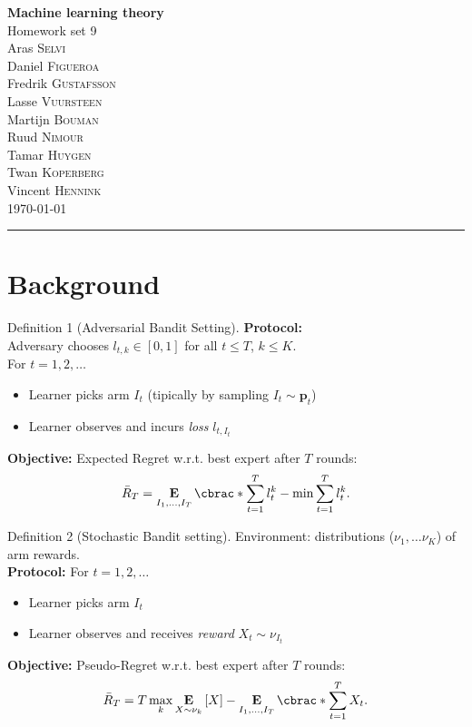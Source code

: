 \documentclass[10pt, a4paper, twoside]{amsart}
\theoremstyle{plain}
\DeclarePairedDelimiter\cbrac\{\}
\newcommand{\Ev}{\operatorname*{\ensuremath{\mathbf{E}}}} %
\begin{document}
\begin{center}
    {\huge\bf Machine learning theory}\\
    {\large\sc Homework set 9 }\\ \vspace{1em}
    {Aras} \textsc{ {Selvi}} \\
    {Daniel} \textsc{ {Figueroa}}\\
    {Fredrik} \textsc{ {Gustafsson}}\\
    {Lasse} \textsc{ {Vuursteen}}\\
    {Martijn} \textsc{ {Bouman}}\\
    {Ruud} \textsc{ {Nimour}}\\
    {Tamar} \textsc{ {Huygen}}\\
    {Twan} \textsc{ {Koperberg}}\\
    {Vincent} \textsc{ {Hennink}}\\ 
    \bigskip
    \today \bigskip
    \hrule
    \bigskip
\end{center}

\section{Background}
\begin{definitionbox}{Definition 1 (Adversarial Bandit Setting).}
  \textbf{Protocol:}\\
  Adversary chooses $l_{t,k} \in [0,1]$ for all $t \leq T$, $k \leq K$.\\
  For $t = 1,2, \ldots$
\begin{itemize}
    \item Learner picks arm $I_t$ (tipically by sampling $I_t \sim \mathbf{p}_t$)
    \item Learner observes and incurs \textit{loss} $l_{t, I_{t}}$
\end{itemize}
\textbf{Objective:} Expected Regret w.r.t. best expert after $T$ rounds:
\begin{equation*}
    \bar{R}_T = \Ev_{I_1 , \ldots , I_T} \cbrac*{\sum^T_{t=1} l_t^k} - \min \sum_{t=1}^T l_t^k .
\end{equation*}
\end{definitionbox}
\begin{definitionbox}{Definition 2 (Stochastic Bandit setting).}
  Environment: distributions ($\nu_1 , \ldots \nu_K$) of arm rewards.\\
\textbf{Protocol:} For $t = 1,2, \ldots$
\begin{itemize}
    \item Learner picks arm $I_t$
    \item Learner observes and receives \textit{reward} $X_t \sim \nu_{I_t}$
\end{itemize}
\textbf{Objective:} Pseudo-Regret w.r.t. best expert after $T$ rounds:
\begin{equation*}
    \bar{R}_T = T \max_{k} \Ev_{X \sim \nu_k} \left[ X \right] - \Ev_{I_1 , \ldots , I_T} \cbrac*{ \sum^T_{t=1} X_t} .
\end{equation*}
\end{definitionbox}
\end{document}
